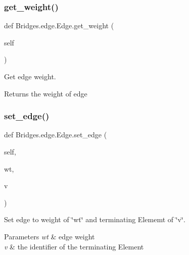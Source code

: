 \subsubsection{\texorpdfstring{get\+\_\+weight()}{get\_weight()}}
{\footnotesize\ttfamily def Bridges.\+edge.\+Edge.\+get\+\_\+weight (\begin{DoxyParamCaption}\item[{}]{self }\end{DoxyParamCaption})}



Get edge weight. 

\begin{DoxyReturn}{Returns}
the weight of edge 
\end{DoxyReturn}
\mbox{\label{class_bridges_1_1edge_1_1_edge_aa65288b314e414374bc3d2e0a0792c03}} 
\subsubsection{\texorpdfstring{set\+\_\+edge()}{set\_edge()}}
{\footnotesize\ttfamily def Bridges.\+edge.\+Edge.\+set\+\_\+edge (\begin{DoxyParamCaption}\item[{}]{self,  }\item[{}]{wt,  }\item[{}]{v }\end{DoxyParamCaption})}



Set edge to weight of \char`\"{}wt\char`\"{} and terminating Elememt of \char`\"{}v\char`\"{}. 


\begin{DoxyParams}{Parameters}
{\em wt} & edge weight \\
\hline
{\em v} & the identifier of the terminating Element \\
\hline
\end{DoxyParams}
\mbox{\label{class_bridges_1_1edge_1_1_edge_aa9ca872601b29ed48d492c7a54a1cc42}} 
